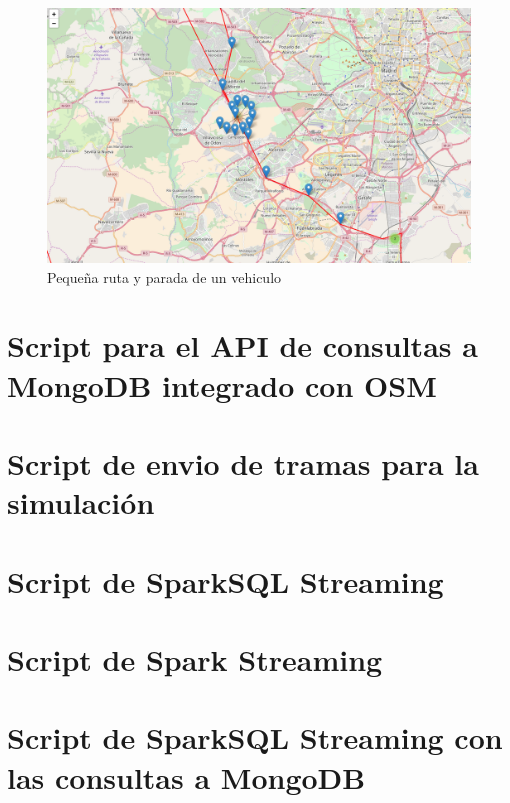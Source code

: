 \begin{figure}[htp]
\centering
\includegraphics[scale=.30]{Anexos/rutaConParada.png}
\caption{Pequeña ruta y parada de un vehiculo}
\label{littleRouteWithStop}
\end{figure}


\chapter{Script para el API de consultas a MongoDB integrado con OSM\label{apendB}}


\newpage
\chapter{Script de envio de tramas para la simulación\label{apendC}}


\newpage
\chapter{Script de SparkSQL Streaming}\label{apendD}


\newpage
\chapter{Script de Spark Streaming}\label{apendE}


\newpage
\chapter{Script de SparkSQL Streaming con las consultas a MongoDB}\label{apendF}


